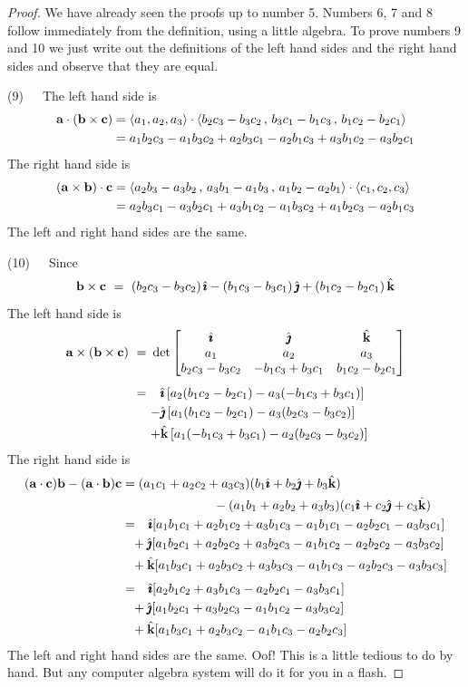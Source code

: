 \begin{proof}
We have already seen the proofs up to number 5. Numbers 6, 7 and 8 
follow immediately from the definition, using a little algebra. To prove 
numbers 9 and 10 we just write out the definitions of the left hand sides 
and the right hand sides and observe that they are equal.

\medskip
\noindent (9)\ \ \ The left hand side is
\begin{align*}
\mathbf{a}\cdot(\mathbf{b}\times\mathbf{c})
&=\left< a_1,a_2,a_3\right>\cdot
      \left< b_2c_3-b_3c_2\,,\, b_3c_1-b_1c_3\,,\, b_1c_2-b_2c_1\right>\\
&=a_1b_2c_3 - a_1b_3c_2 + a_2b_3c_1 - a_2b_1c_3 + a_3b_1c_2 - a_3b_2c_1
\end{align*}
The right hand side is
\begin{align*}
(\mathbf{a}\times\mathbf{b})\cdot\mathbf{c}
&=\left< a_2b_3-a_3b_2\,,\, a_3b_1-a_1b_3\,,\, a_1b_2-a_2b_1\right>\cdot
       \left< c_1,c_2,c_3\right> \\
&=a_2b_3c_1 - a_3b_2c_1 + a_3b_1c_2 - a_1b_3c_2 + a_1b_2c_3 - a_2b_1c_3
\end{align*}
The left and right hand sides are the same.

\medskip
\noindent (10)\ \ \ Since
$$
\mathbf{b}\times\mathbf{c}
\ =\ (b_2c_3-b_3c_2)\,\hat{\pmb{\imath}}-(b_1c_3-b_3c_1)\,\hat{\pmb{\jmath}}
    +(b_1c_2-b_2c_1)\,\hat{\mathbf{k}}
$$
The left hand side is
\begin{align*}
\mathbf{a}\times(\mathbf{b}\times\mathbf{c})
\ =\ &\det\left[\begin{matrix} \hat{\pmb{\imath}} & \hat{\pmb{\jmath}} & \hat{\mathbf{k}} \\
                     a_1&a_2&a_3\\
                 b_2c_3-b_3c_2&-b_1c_3+b_3c_1&b_1c_2-b_2c_1
             \end{matrix}\right]\\[0.05in]
\ =\ &\phantom{-}\hat{\pmb{\imath}}\,[a_2(b_1c_2-b_2c_1)-a_3(-b_1c_3+b_3c_1)]\\
     & {-}\hat{\pmb{\jmath}}\,[a_1(b_1c_2-b_2c_1)-a_3(b_2c_3-b_3c_2)]\\
     & {+}\hat{\mathbf{k}}\,[a_1(-b_1c_3+b_3c_1)-a_2(b_2c_3-b_3c_2)]
\end{align*}
The right hand side is
\begin{align*}
(\mathbf{a}\cdot\mathbf{c})\mathbf{b}-(\mathbf{a}\cdot\mathbf{b})\mathbf{c}
&=(a_1c_1+a_2c_2+a_3c_3)(b_1\hat{\pmb{\imath}}+b_2\hat{\pmb{\jmath}}+b_3\hat{\mathbf{k}}) \\
     &\hskip1in -(a_1b_1+a_2b_2+a_3b_3)(c_1\hat{\pmb{\imath}}+c_2\hat{\pmb{\jmath}}+c_3\hat{\mathbf{k}})\\
&=\phantom{-}
\hat{\pmb{\imath}}[a_1b_1c_1+a_2b_1c_2+a_3b_1c_3-a_1b_1c_1-a_2b_2c_1-a_3b_3c_1] \\
&\phantom{=}+\hat{\pmb{\jmath}}[a_1b_2c_1+a_2b_2c_2+a_3b_2c_3-a_1b_1c_2-a_2b_2c_2-a_3b_3c_2] \\
&\phantom{=}+\hat{\mathbf{k}}[a_1b_3c_1+a_2b_3c_2+a_3b_3c_3-a_1b_1c_3-a_2b_2c_3-a_3b_3c_3]
\\[0.05in]
&=\phantom{-} \hat{\pmb{\imath}}[a_2b_1c_2+a_3b_1c_3-a_2b_2c_1-a_3b_3c_1] \\
 &\phantom{=} +\hat{\pmb{\jmath}}[a_1b_2c_1+a_3b_2c_3-a_1b_1c_2-a_3b_3c_2]\\
 &\phantom{=} +\hat{\mathbf{k}}[a_1b_3c_1+a_2b_3c_2-a_1b_1c_3-a_2b_2c_3]
\end{align*}
The left and right hand sides are the same. Oof! This is a little tedious
to do by hand. But any computer algebra system will do it for you in a 
flash.
\end{proof}


